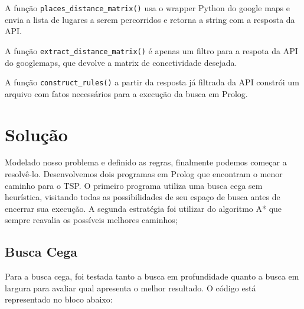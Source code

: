 \documentclass[12pt,a4paper]{article}
\begin{document}
A função \texttt{places_distance_matrix()} usa o wrapper Python do google maps e envia a lista de lugares a serem percorridos e retorna a string com a resposta da API. 

A função \texttt{extract_distance_matrix()} é apenas um filtro para a respota da API do googlemaps, que devolve a matrix de conectividade desejada.

A função  \texttt{construct_rules()} a partir da resposta já filtrada da API constrói um arquivo com fatos necessários para a execução da busca em Prolog.


\newpage
\section{Solução}
Modelado nosso problema e definido as regras, finalmente podemos começar a resolvê-lo. Desenvolvemos dois programas em Prolog que encontram o menor caminho para o TSP. O primeiro programa utiliza uma busca cega sem heurística, visitando todas as possibilidades de seu espaço de busca antes de encerrar sua execução. A segunda estratégia foi utilizar do algoritmo A* que sempre reavalia os possíveis melhores caminhos;

\subsection{Busca Cega}
Para a busca cega, foi testada tanto a busca em profundidade quanto a busca em largura para avaliar qual apresenta o melhor resultado. O código está representado no bloco abaixo:

\begin{mdframed}[linecolor=black, topline=true, bottomline=true,
  leftline=false, rightline=false, backgroundcolor=yellow!10!white]
\inputminted[tabsize=2,linenos=true,fontsize=\footnotesize,breaklines=true,breakafter=format]{prolog}{../buscacega_profundidade.pl}
\end{mdframed}
  \label{Code:2}
\end{document}
